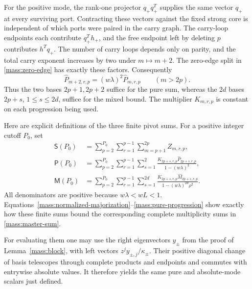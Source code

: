 \documentclass[11pt]{amsart}
\theoremstyle{definition}
\theoremstyle{remark}
\numberwithin{equation}{section}
\begin{document}
For the positive mode, the rank-one projector $q_+q_+^T$ supplies the
same vector $q_+$ at every surviving port. Contracting these vectors
against the fixed strong core is independent of which ports were
paired in the carry graph. The carry-loop endpoints each contribute
$q_+^Th_+$, and the free endpoint left by deleting $p$ contributes
$h^Tq_+$. The number of carry loops depends only on parity, and the
total carry exponent increases by two under $m\mapsto m+2$.
The zero-edge split in \eqref{mass:zero-edge} has exactly these factors.
Consequently
\begin{equation}\label{mass:pure-progression}
 \widehat P_{m+2,r,p}=(w\lambda)^2\widehat P_{m,r,p}
 \qquad(m>2p).
\end{equation}
Thus the two bases $2p+1,2p+2$ suffice for the pure sum, whereas the
$2d$ bases $2p+s$, $1\le s\le2d$, suffice for the mixed bound.
The multiplier $K_{m,r,p}$ is constant on each progression being used.

Here are explicit definitions of the three finite pivot sums. For a
positive integer cutoff $P_0$, set
\begin{align}
 \mathsf S(P_0)
 &=\sum_{p=2}^{P_0}\sum_{r=1}^{p-1}\sum_{m=p+1}^{2p}Z_{m,r,p},
 \label{mass:short-box}\\
 \mathsf P(P_0)
 &=\sum_{p=2}^{P_0}\sum_{r=1}^{p-1}\sum_{s=1}^{2}
 \frac{K_{2p+s,r,p}\widehat P_{2p+s,r,p}}
      {1-(w\lambda)^2},\label{mass:pure-box}\\
 \mathsf M(P_0)
 &=\sum_{p=2}^{P_0}\sum_{r=1}^{p-1}\sum_{s=1}^{2d}
 \frac{K_{2p+s,r,p}\widehat M_{2p+s,r,p}}
      {1-(w\lambda)^{2d}\rho^2}.\label{mass:mixed-box}
\end{align}
All denominators are positive because $w\lambda<wL<1$.
Equations~\eqref{mass:normalized-majorization}--\eqref{mass:pure-progression}
show exactly how these finite sums bound the corresponding complete
multiplicity sums in \eqref{mass:master-sum}.

For evaluating them one may use the right eigenvectors $y_\pm$ from
the proof of Lemma~\ref{mass:block}, with left vectors
$z^j y_{\pm,j}/\kappa_\pm$. Their positive diagonal change of basis
telescopes through complete products and endpoints and commutes with
entrywise absolute values. It therefore yields the same pure and
absolute-mode scalars just defined.
\end{document}
